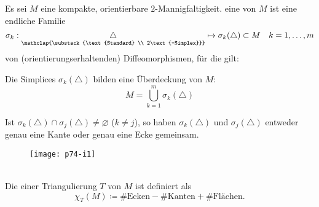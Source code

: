 \begin{definition}
  Es sei \( M \) eine kompakte, orientierbare \( 2 \)-Mannigfaltigkeit. eine \label{def:triangulierung} von \( M \) ist eine endliche Familie
  \begin{equation*}
    \sigma_k : \underset{\mathclap{\substack{\text{Standard} \\ 2\text{-Simplex}}}}{\triangle} \mapsto \sigma_k(\triangle) \subset M \quad k = 1,\dots,m
  \end{equation*}
  von (orientierungserhaltenden) Diffeomorphismen, für die gilt:
  \begin{enumerate}
    \item Die Simplices \( \sigma_k(\triangle) \) bilden eine Überdeckung von \( M \):
    \begin{equation*}
      M = \bigcup_{k = 1}^m \sigma_k(\triangle)
    \end{equation*}

    \begin{minipage}{.45\textwidth}
      \item Ist \( \sigma_k(\triangle) \cap \sigma_j(\triangle) \neq \varnothing \) (\( k \neq j \)), so haben \( \sigma_k(\triangle) \) und \( \sigma_j(\triangle) \) entweder genau eine Kante oder genau eine Ecke gemeinsam.
    \end{minipage}
    \hfill
    \begin{minipage}{.525\textwidth}
      \begin{figure}[H]
        \texttt{[image: p74-i1]}
      \end{figure}
    \end{minipage}
  \end{enumerate}
  \ \\

  Die  einer Triangulierung \( T \) von \( M \) ist definiert als
  \begin{equation*}
    \chi_T(M) \coloneqq \#\text{Ecken} - \#\text{Kanten} + \#\text{Flächen.}
  \end{equation*}
\end{definition}

